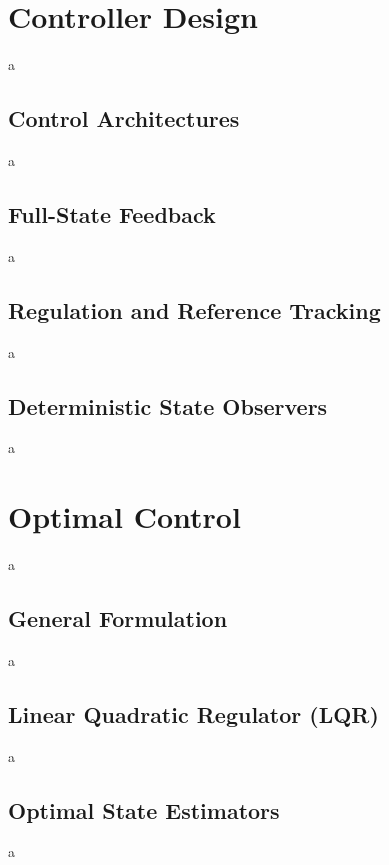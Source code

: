 \documentclass[a4paper,11pt]{book}
\numberwithin{figure}{chapter}
\numberwithin{equation}{chapter}
\numberwithin{table}{chapter}
\theoremstyle{definition}
\begin{document}
\chapter{Controller Design}

a

\section{Control Architectures}

a

\section{Full-State Feedback}

a

\section{Regulation and Reference Tracking}

a

\section{Deterministic State Observers}

a

\clearpage
\chapter{Optimal Control}

a

\section{General Formulation}

a

\section{Linear Quadratic Regulator (LQR)}

a

\section{Optimal State Estimators}

a
\end{document}
